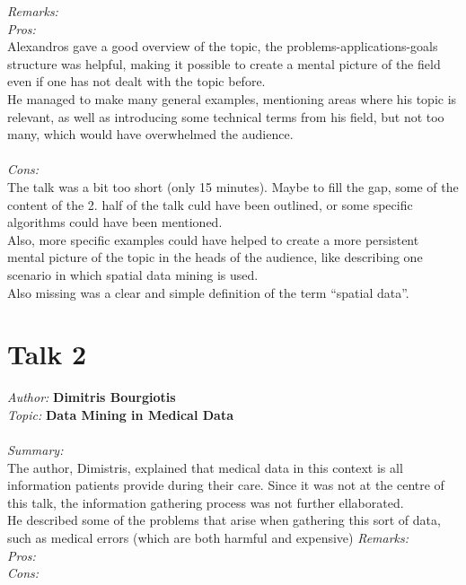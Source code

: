 \documentclass[runningheads,a4paper]{llncs}
\begin{document}
\noindent\textit{Remarks:}\\
\textit{Pros:}\\
Alexandros gave a good overview of the topic, the problems-applications-goals structure was helpful, making it possible to create a mental picture of the field even if one has not dealt with the topic before.\\
He managed to make many general examples, mentioning areas where his topic is relevant, as well as introducing some technical terms from his field, but not too many, which would have overwhelmed the audience.\\
\\
\textit{Cons:}\\
The talk was a bit too short (only 15 minutes). Maybe to fill the gap, some of the content of the 2. half of the talk culd have been outlined, or some specific algorithms could have been mentioned.\\
Also, more specific examples could have helped to create a more persistent mental picture of the topic in the heads of the audience, like describing one scenario in which spatial data mining is used.\\
Also missing was a clear and simple definition of the term ``spatial data''.


\newpage
\section{Talk 2}
\textit{Author:} \textbf{Dimitris Bourgiotis}\\
\textit{Topic:} \hspace{0.1cm} \textbf{Data Mining in Medical Data}\\
\\
\textit{Summary:} \\
The author, Dimistris, explained that medical data in this context is all information patients provide during their care. Since it was not at the centre of this talk, the information gathering process was not further ellaborated.\\
He described some of the problems that arise when gathering this sort of data, such as medical errors (which are both harmful and expensive)
\textit{Remarks:} \\
\textit{Pros:}\\
\textit{Cons:}\\



\end{document}

